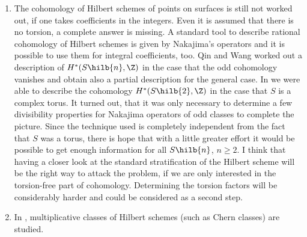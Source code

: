\begin{enumerate}
\item The cohomology of Hilbert schemes of points on surfaces is still not worked out, if one takes coefficients in the integers. Even it is assumed that there is no torsion, a complete answer is missing. A standard tool to describe rational cohomology of Hilbert schemes is given by Nakajima's operators and it is possible to use them for integral coefficients, too. Qin and Wang worked out a description of $H^*(S\hilb{n},\Z)$ in the case that the odd cohomology vanishes and obtain also a partial description for the general case. In \cite{GS} we were able to describe the cohomology $H^*(S\hilb{2},\Z)$ in the case that $S$ is a complex torus. It turned out, that it was only necessary to determine a few divisibility properties for Nakajima operators of odd classes to complete the picture. Since the technique used is completely independent from the fact that $S$ was a torus, there is hope that with a little greater effort it would be possible to get enough information for all $S\hilb{n}$, $n\geq 2$. I think that having a closer look at the standard stratification of the Hilbert scheme will be the right way to attack the problem, if we are only interested in the torsion-free part of cohomology. 
Determining the torsion factors will be considerably harder and could be considered as a second step.

\item In \cite{Universal}, multiplicative classes of Hilbert schemes (such as Chern classes) are studied. 
\end{enumerate}
